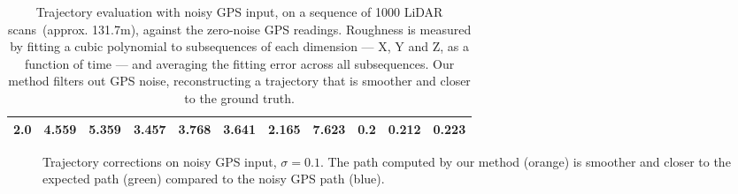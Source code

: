 \begin{table}[h!]
{\begin{tabular}{c|ccccc|ccccc}
            2.0                     & 4.559                                         & 5.359                                   & 3.457                                & 3.768                                  & 3.641          & 2.165          & 7.623          & 0.2            & 0.212          & 0.223          \\
            \hline
        \end{tabular}
    }
    \caption[Trajectory evaluation with noisy GPS]{Trajectory evaluation with noisy GPS input, on a sequence of 1000 LiDAR scans~(approx. 131.7m), against the zero-noise GPS readings. Roughness is measured by fitting a cubic polynomial to subsequences of each dimension --- X, Y and Z, as a function of time --- and averaging the fitting error across all subsequences. Our method filters out GPS noise, reconstructing a trajectory that is smoother and closer to the ground truth.}
    \label{tab:gps-noisy}
\end{table}
\begin{figure}[h]
    \centering
    \caption[Trajectory corrections over noisy GPS]{Trajectory corrections on noisy GPS input, $\sigma = 0.1$. The path computed by our method (orange) is smoother and closer to the expected path (green) compared to the noisy GPS path (blue).}
    \label{fig:gps-noise-correction}
\end{figure}

